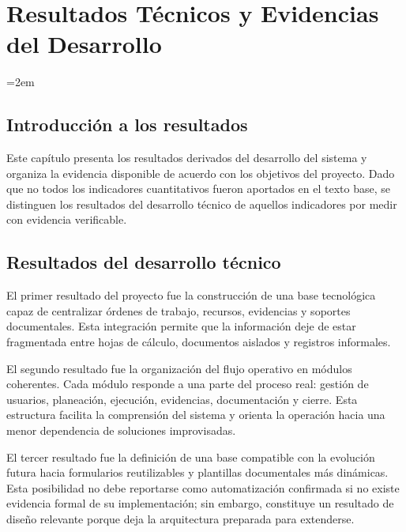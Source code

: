 
\chapter{Resultados Técnicos y Evidencias del Desarrollo}
\label{ch:resultados}

\setlength{\parindent}{0pt}
\setlength{\parskip}{6pt}
\sloppy
\emergencystretch=2em
\raggedbottom
\section{Introducción a los resultados}
\label{sec:introduccion-resultados}

Este capítulo presenta los resultados derivados del desarrollo del sistema y organiza la evidencia disponible de acuerdo con los objetivos del proyecto. Dado que no todos los indicadores cuantitativos fueron aportados en el texto base, se distinguen los resultados del desarrollo técnico de aquellos indicadores por medir con evidencia verificable.

\section{Resultados del desarrollo técnico}
\label{sec:resultados-desarrollo}

El primer resultado del proyecto fue la construcción de una base tecnológica capaz de centralizar órdenes de trabajo, recursos, evidencias y soportes documentales. Esta integración permite que la información deje de estar fragmentada entre hojas de cálculo, documentos aislados y registros informales.

El segundo resultado fue la organización del flujo operativo en módulos coherentes. Cada módulo responde a una parte del proceso real: gestión de usuarios, planeación, ejecución, evidencias, documentación y cierre. Esta estructura facilita la comprensión del sistema y orienta la operación hacia una menor dependencia de soluciones improvisadas.

El tercer resultado fue la definición de una base compatible con la evolución futura hacia formularios reutilizables y plantillas documentales más dinámicas. Esta posibilidad no debe reportarse como automatización confirmada si no existe evidencia formal de su implementación; sin embargo, constituye un resultado de diseño relevante porque deja la arquitectura preparada para extenderse.


